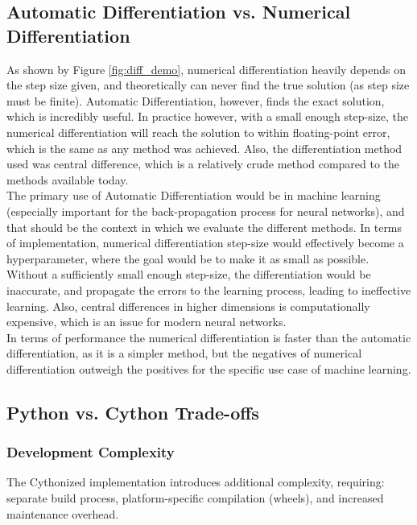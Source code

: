 \subsection{Automatic Differentiation vs. Numerical Differentiation}
As shown by Figure \ref{fig:diff_demo}, numerical differentiation heavily depends on the step size given,
and theoretically can never find the true solution (as step size must be finite). 
Automatic Differentiation, however, finds the exact solution, which is incredibly useful. 
In practice however, with a small enough step-size, the numerical differentiation will reach the solution
to within floating-point error, which is the same as any method was achieved. Also, the differentiation method
used was central difference, which is a relatively crude method compared to the methods available today. \\

The primary use of Automatic Differentiation would be in machine learning (especially important for the back-propagation process for neural networks), 
and that should be the context in which we evaluate the different methods. 
In terms of implementation, numerical differentiation step-size would effectively become 
a hyperparameter, where the goal would be to make it as small as possible. Without a sufficiently small enough step-size, 
the differentiation would be inaccurate, and propagate the errors to the learning process, leading to ineffective learning.
Also, central differences in higher dimensions is computationally expensive, which is an issue for modern neural networks. \\

In terms of performance the numerical differentiation is faster than the automatic differentiation, as it is a simpler method, 
but the negatives of numerical differentiation outweigh the positives for the specific use case of machine learning.


\subsection{Python vs. Cython Trade-offs}

\subsubsection{Development Complexity}
The Cythonized implementation introduces additional complexity, requiring: separate build process, platform-specific compilation (wheels), and increased maintenance overhead.

